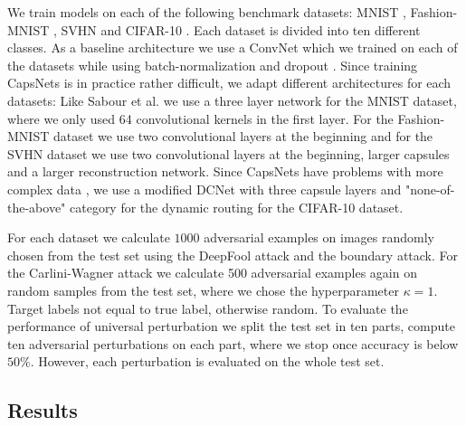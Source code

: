 \documentclass{article}
\begin{document}
We train models on each of the following benchmark datasets: MNIST \cite{mnist}, Fashion-MNIST \cite{fashion}, SVHN \cite{svhn} and CIFAR-10 \cite{cifar}. Each dataset is divided into ten different classes. 
As a baseline architecture we use a ConvNet which we trained on each of the datasets while using batch-normalization \cite{batchnorm} and dropout \cite{dropout}. Since training CapsNets is in practice rather difficult, we adapt different architectures for each datasets: Like Sabour et al. \cite{capsules} we use a three layer network for the MNIST dataset, where we only used 64 convolutional kernels in the first layer. For the Fashion-MNIST dataset we use two convolutional layers at the beginning and for the SVHN dataset we use two convolutional layers at the beginning, larger capsules and a larger reconstruction network. Since CapsNets have problems with more complex data \cite{complex}, we use a modified DCNet \cite{denseanddiverse} with three capsule layers and "none-of-the-above" category for the dynamic routing \cite{capsules} for the CIFAR-10 dataset.

For each dataset we calculate $1000$ adversarial examples on images randomly chosen from the test set using the DeepFool attack and the boundary attack.
For the Carlini-Wagner attack we calculate 500 adversarial examples again on random samples from the test set, where we chose the hyperparameter $\kappa = 1$. Target labels not equal to true label, otherwise random. To evaluate the performance of universal perturbation we split the test set in ten parts, compute ten adversarial perturbations on each part, where we stop once accuracy is below $50\%$. However, each perturbation is evaluated on the whole test set.


\subsection{Results}
\end{document}
